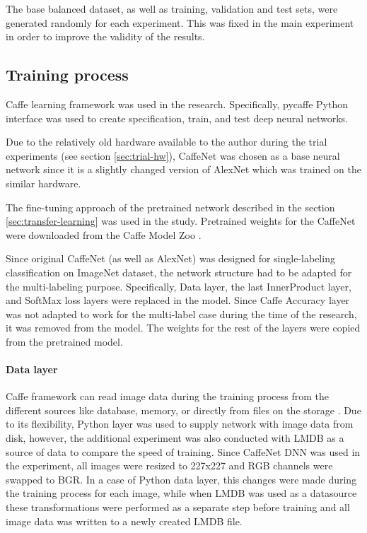     The base balanced dataset, as well as training, validation and test sets, were generated randomly for each experiment. This was fixed in the main experiment in order to improve the validity of the results.
    
    \subsection{Training process}
    \label{sec:trial-training}
    Caffe \cite{Caffe} learning framework was used in the research. Specifically, pycaffe \cite{pycaffe} Python interface was used to create specification, train, and test deep neural networks.
    
    Due to the relatively old hardware available to the author during the trial experiments (see section \ref{sec:trial-hw}), CaffeNet \cite{CaffeNet} was chosen as a base neural network since it is a slightly changed version of AlexNet \cite{Krizhevsky2012ImageNetDNN} which was trained on the similar hardware.
    
    The fine-tuning approach of the pretrained network described in the section \ref{sec:transfer-learning} was used in the study. Pretrained weights for the CaffeNet were downloaded from the Caffe Model Zoo \cite{CaffeModelZoo}.
    
    Since original CaffeNet (as well as  AlexNet) was designed for single-labeling classification on ImageNet dataset, the network structure had to be adapted for the multi-labeling purpose. Specifically, Data layer, the last InnerProduct layer, and SoftMax loss layers were replaced in the model. Since Caffe Accuracy layer was not adapted to work for the multi-label case during the time of the research, it was removed from the model. The weights for the rest of the layers were copied from the pretrained model.
    
    \paragraph{Data layer}
    Caffe framework can read image data during the training process from the different sources like database, memory, or directly from files on the storage \cite{CaffeLayerCatalogue}. Due to its flexibility, Python layer was used to supply network with image data from disk, however, the additional experiment was also conducted with LMDB \cite{lmdb} as a source of data to compare the speed of training. Since CaffeNet DNN was used in the experiment, all images were resized to 227x227 and RGB channels were swapped to BGR. In a case of Python data layer, this changes were made during the training process for each image, while when LMDB was used as a datasource these transformations were performed as a separate step before training and all image data was written to a newly created LMDB file.
    
